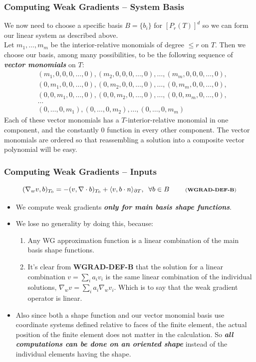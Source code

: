 \documentclass[compress]{beamer}
\begin{document}
\begin{frame}
  \frametitle{Computing Weak Gradients -- System Basis}
  We now need to choose a specific basis $B=\{b_i\}$ for $[P_r(T)]^d$ so we can form our linear system as described above.\\
  \pause
  Let $m_1,\dots,m_m$ be the interior-relative monomials of degree $\le r$ on $T$. Then we choose our basis,
  among many possibilities, to be the following sequence of \emph{\textbf{vector monomials}} on $T$:
  \begin{align*}
    &(m_1,0,0,0,\dots,0), (m_2,0,0,0,\dots,0), \dots, (m_m,0,0,0,\dots,0),\\
    &(0,m_1,0,0,\dots,0), (0,m_2,0,0,\dots,0), \dots, (0,m_m,0,0,\dots,0),\\
    &(0,0,m_1,0,\dots,0), (0,0,m_2,0,\dots,0), \dots, (0,0,m_m,0,\dots,0),\\
    &\dots\\
    &(0,\dots,0,m_1), (0,\dots,0,m_2), \dots, (0,\dots,0,m_m)
  \end{align*}
  \pause
  Each of these vector monomials has a $T$-interior-relative monomial in one component, and the constantly $0$ function in
  every other component.  The vector monomials are ordered so that reassembling a solution into a composite vector polynomial
  will be easy. 
\end{frame}

\begin{frame}
  \frametitle{Computing Weak Gradients -- Inputs}
  \begin{equation*}
    (\nabla_w v, b)_{T_0} = -(v, \nabla \cdot b)_{T_0} + \langle v, b \cdot n \rangle_{\partial T}, \;\; \forall b \in B 
    \;\quad\quad \text{\scriptsize (\textbf{WGRAD-DEF-B})}
  \end{equation*}
  \pause
  \begin{itemize}[<+->]
    \item  We compute weak gradients \emph{\textbf{only for main basis shape functions}}.
    \item We lose no generality by doing this, because:
      \begin{enumerate}[<+->]
        \item Any WG approximation function is a linear combination of the main basis shape functions.
        \item It's clear from {\scriptsize \textbf{WGRAD-DEF-B}} that the solution for a linear combination $v = \sum_i a_i v_i$
          is the same linear combination of the individual solutions, $\nabla_w v = \sum_i a_i \nabla_w v_i$.
          Which is to say that the weak gradient operator is linear.
      \end{enumerate}
    \item Also since both a shape function and our vector monomial basis use coordinate systems defined relative to faces of the finite
      element, the actual position of the finite element does not matter in the calculation.
      So \emph{\textbf{all computations can be done on an oriented shape}} instead of the individual elements having the shape.
  \end{itemize}
\end{frame}
\end{document}
